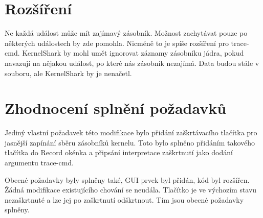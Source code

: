 \section{Rozšíření}

Ne každá událost může mít zajímavý zásobník. Možnost zachytávat pouze po některých událostech by zde pomohla. Nicméně to je spíše rozšíření pro trace-cmd. KernelShark by mohl umět ignorovat záznamy zásobníku jádra, pokud navazují na nějakou událost, po které nás zásobník nezajímá. Data budou stále v souboru, ale KernelShark by je nenačetl.

\section{Zhodnocení splnění požadavků}
Jediný vlastní požadavek této modifikace bylo přidání zaškrtávacího tlačítka pro jasnější zapínání sběru zásobníků kernelu. Toto bylo splněno přidáním takového tlačítka do Record okénka a připsání interpretace zaškrtnutí jako dodání argumentu trace-cmd.

Obecné požadavky byly splněny také, GUI prvek byl přidán, kód byl rozšířen. Žádná modifikace existujícího chování se neudála. Tlačítko je ve výchozím stavu nezaškrtnuté a lze jej po zaškrtnutí odškrtnout. Tím jsou obecné požadavky splněny.